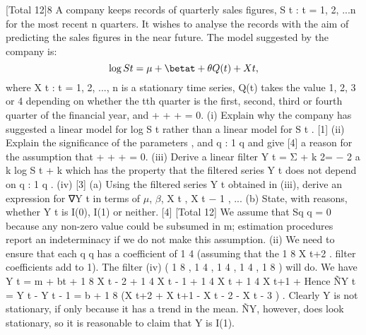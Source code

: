 

\usepackage{vmargin}
\usepackage{amsmath}
\usepackage{graphics}
\usepackage{epsfig}
\usepackage{enumerate}
\usepackage{multicol}
\usepackage{subfigure}
\usepackage{fancyhdr}
\usepackage{listings}
\usepackage{framed}
\usepackage{graphicx}
\usepackage{amsmath}
\usepackage{chngpage}

\usepackage{vmargin}



\setmargins{2.0cm}{2.5cm}{16 cm}{22cm}{0.5cm}{0cm}{1cm}{1cm}

\renewcommand{\baselinestretch}{1.3}

\setcounter{MaxMatrixCols}{10}








[Total 12]8
A company keeps records of quarterly sales figures, {S t : t = 1, 2, ...n} for the most
recent n quarters. It wishes to analyse the records with the aim of predicting the
sales figures in the near future.
The model suggested by the company is:
\[\log S t = \mu + \betat + \theta Q ( t ) + X t ,\]
where {X t : t = 1, 2, ..., n} is a stationary time series, Q(t) takes the value 1, 2, 3 or
4 depending on whether the tth quarter is the first, second, third or fourth
quarter of the financial year, and  +  +  +  = 0.
(i) Explain why the company has suggested a linear model for log S t rather
than a linear model for S t .
[1]
(ii) Explain the significance of the parameters \mu, \beta and {\theta q : 1 \leq q } and give
[4]
a reason for the assumption that  +  +  +  = 0.
(iii) Derive a linear filter Y t = Σ + k 2= − 2 a k log S t + k which has the property that the
filtered series {Y t } does not depend on {\theta q : 1 \leq q }.
(iv)
[3]
(a) Using the filtered series {Y t } obtained in (iii), derive an expression
for ∇Y t in terms of $\mu$, $\beta$, X t , X t − 1 , ...
(b) State, with reasons, whether {Y t } is I(0), I(1) or neither.
[4]
[Total 12]
\newpage
We assume that Sq q = 0 because any non-zero value could be subsumed in
m; estimation procedures report an indeterminacy if we do not make this
assumption.
(ii)
We need to ensure that each q q has a coefficient of
1
4 (assuming that the
1
8 X t+2 .
filter coefficients add to 1).
The filter
(iv)
( 1 8 , 1 4 , 1 4 , 1 4 , 1 8 ) will do.
We have
Y t = m + bt +
1
8
X t - 2 +
1
4
X t - 1 +
1
4
X t +
1
4
X t+1 +
Hence
ÑY t = Y t - Y t - 1 = b +
1
8
(X t+2 + X t+1 - X t - 2 - X t - 3 ) .
Clearly Y is not stationary, if only because it has a trend in the mean.
ÑY, however, does look stationary, so it is reasonable to claim that Y is
I(1).


